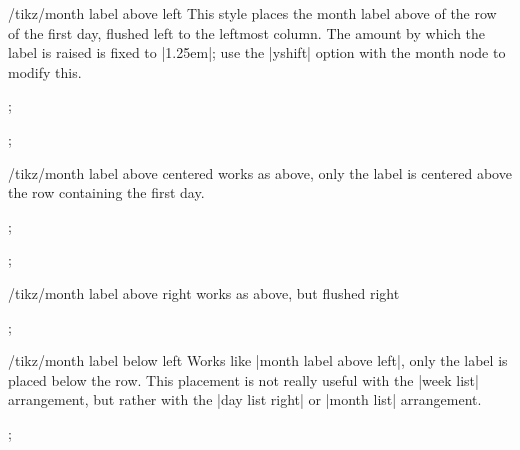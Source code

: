 \begin{stylekey}{/tikz/month label above left}
  This style places the month label above of the row of the first day,
  flushed left to the leftmost column. The amount by which the label
  is raised is fixed to |1.25em|; use the |yshift| option with the
  month node to modify this.
\begin{codeexample}[]
\tikz
  \calendar [dates=2000-01-28 to 2000-02-03,
             day list right,month xshift=1em,
             month label above left];
\end{codeexample}
\begin{codeexample}[]
\tikz
  \calendar [dates=2000-01-20 to 2000-02-10,
             week list,month label above left];
\end{codeexample}
\end{stylekey}

\begin{stylekey}{/tikz/month label above centered}
  works as above, only the label is centered above the row containing
  the first day.
\begin{codeexample}[]
\tikz
  \calendar [dates=2000-02-01 to 2000-02-last,
             day list right,month label above centered];
\end{codeexample}
\begin{codeexample}[]
\tikz
  \calendar [dates=2000-01-20 to 2000-02-10,
             week list,month label above centered];
\end{codeexample}
\end{stylekey}

\begin{stylekey}{/tikz/month label above right}
  works as above, but flushed right
\begin{codeexample}[]
\tikz
  \calendar [dates=2000-01-20 to 2000-02-10,
             week list,month label above right];
\end{codeexample}
\end{stylekey}

\begin{stylekey}{/tikz/month label below left}
  Works like |month label above left|, only the label is placed below
  the row. This placement is not really useful with the |week list|
  arrangement, but rather with the |day list right| or |month list|
  arrangement.
\begin{codeexample}[]
\tikz
  \calendar [dates=2000-02-01 to 2000-02-last,
             day list right,month label below left];
\end{codeexample}
\end{stylekey}


